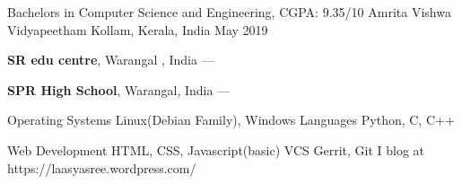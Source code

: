 \documentclass[11pt, a4paper]{awesome-cv}
\begin{document}
\makecvheader[C]



\begin{cventries}
  \cventry
    {Bachelors in Computer Science and Engineering, CGPA: 9.35/10} %
    { Amrita Vishwa Vidyapeetham} %
    {Kollam, Kerala, India} %
    {May 2019} %
    {
      \begin{cvitems} %
         \item {\textbf{SR edu centre}, Warangal , India --- }
         \vspace{0.5mm}
         \item {\textbf{SPR High School}, Warangal, India --- }
      \end{cvitems}
    }
\end{cventries}

    


\begin{cvskills}
 \cvskill
 	{Operating Systems} %
    {Linux(Debian Family), Windows} %
  \cvskill
    {Languages} %
    {Python, C, C++} %

  \cvskill
    {Web Development} %
    {HTML, CSS, Javascript(basic)} %
   \cvskill
   	{VCS} %
    {Gerrit, Git}
   \cvskill
   	{I blog at } %
    {https://laasyasree.wordpress.com/} %
\end{cvskills}


\end{document}
